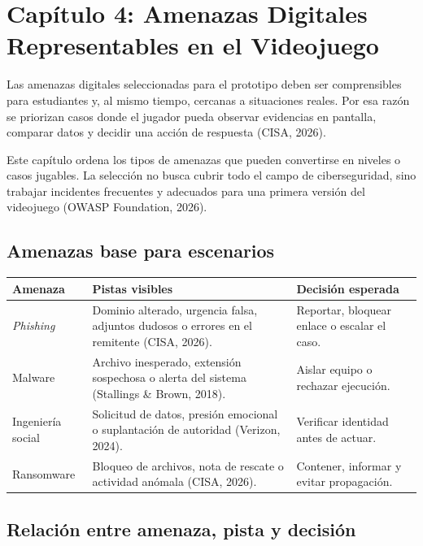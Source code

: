 \section[Cap\'{i}tulo 4: Amenazas Digitales Representables en el Videojuego]{\centering Cap\'{i}tulo 4: Amenazas Digitales Representables en el Videojuego}

Las amenazas digitales seleccionadas para el prototipo deben ser comprensibles para estudiantes y, al mismo tiempo, cercanas a situaciones reales. Por esa raz\'{o}n se priorizan casos donde el jugador pueda observar evidencias en pantalla, comparar datos y decidir una acci\'{o}n de respuesta (CISA, 2026).

Este cap\'{i}tulo ordena los tipos de amenazas que pueden convertirse en niveles o casos jugables. La selecci\'{o}n no busca cubrir todo el campo de ciberseguridad, sino trabajar incidentes frecuentes y adecuados para una primera versi\'{o}n del videojuego (OWASP Foundation, 2026).

\subsection{Amenazas base para escenarios}

\begin{center}
\begin{tabular}{|p{}|p{}|p{}|}
\hline
\textbf{Amenaza} & \textbf{Pistas visibles} & \textbf{Decisi\'{o}n esperada} \\
\hline
\textit{Phishing} & Dominio alterado, urgencia falsa, adjuntos dudosos o errores en el remitente (CISA, 2026). & Reportar, bloquear enlace o escalar el caso. \\
\hline
Malware & Archivo inesperado, extensi\'{o}n sospechosa o alerta del sistema (Stallings \& Brown, 2018). & Aislar equipo o rechazar ejecuci\'{o}n. \\
\hline
Ingenier\'{i}a social & Solicitud de datos, presi\'{o}n emocional o suplantaci\'{o}n de autoridad (Verizon, 2024). & Verificar identidad antes de actuar. \\
\hline
Ransomware & Bloqueo de archivos, nota de rescate o actividad an\'{o}mala (CISA, 2026). & Contener, informar y evitar propagaci\'{o}n. \\
\hline
\end{tabular}
\end{center}

\subsection{Relaci\'{o}n entre amenaza, pista y decisi\'{o}n}

